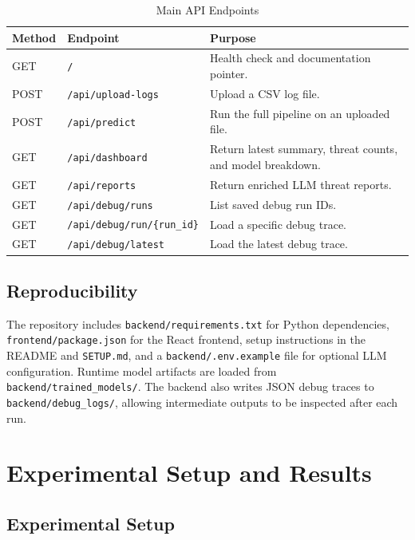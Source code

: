 \documentclass[12pt,a4paper]{article}
\begin{document}
\begin{table}[H]
\centering
\caption{Main API Endpoints}
\label{tab:api}
\begin{tabularx}{\linewidth}{l l X}
\toprule
Method & Endpoint & Purpose \\
\midrule
GET & \texttt{/} & Health check and documentation pointer. \\
POST & \texttt{/api/upload-logs} & Upload a CSV log file. \\
POST & \texttt{/api/predict} & Run the full pipeline on an uploaded file. \\
GET & \texttt{/api/dashboard} & Return latest summary, threat counts, and model breakdown. \\
GET & \texttt{/api/reports} & Return enriched LLM threat reports. \\
GET & \texttt{/api/debug/runs} & List saved debug run IDs. \\
GET & \texttt{/api/debug/run/\{run\_id\}} & Load a specific debug trace. \\
GET & \texttt{/api/debug/latest} & Load the latest debug trace. \\
\bottomrule
\end{tabularx}
\end{table}

\subsection{Reproducibility}

The repository includes \texttt{backend/requirements.txt} for Python dependencies, \texttt{frontend/package.json} for the React frontend, setup instructions in the README and \texttt{SETUP.md}, and a \texttt{backend/.env.example} file for optional LLM configuration. Runtime model artifacts are loaded from \texttt{backend/trained\_models/}. The backend also writes JSON debug traces to \texttt{backend/debug\_logs/}, allowing intermediate outputs to be inspected after each run.

\section{Experimental Setup and Results}

\subsection{Experimental Setup}
\end{document}
